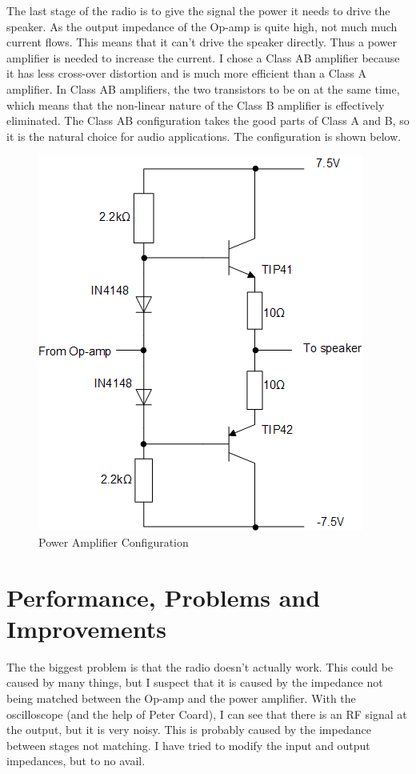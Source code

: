 \documentclass[a4paper,10pt]{report}
\begin{document}
The last stage of the radio is to give the signal the power it needs
to drive the speaker.  As the output impedance of the Op-amp is quite
high, not much much current flows.  This means that it can't drive the
speaker directly.  Thus a power amplifier is needed to increase the
current.  I chose a Class AB amplifier because it has less cross-over
distortion and is much more efficient than a Class A amplifier.  In
Class AB amplifiers, the two transistors to be on at the same time,
which means that the non-linear nature of the Class B amplifier is
effectively eliminated.  The Class AB configuration takes the good
parts of Class A and B, so it is the natural choice for audio
applications.  The configuration is shown below.

\begin{figure}[h]
  \centering
  \includegraphics[scale=0.7]{Power-amp}
  \caption{Power Amplifier Configuration}
\end{figure}
\pagebreak

\chapter{Performance, Problems and Improvements}
The the biggest problem is that the radio doesn't actually work.  This
could be caused by many things, but I suspect that it is caused by the
impedance not being matched between the Op-amp and the power
amplifier.  With the oscilloscope (and the help of Peter Coard), I can
see that there is an RF signal at the output, but it is very noisy.
This is probably caused by the impedance between stages not matching.
I have tried to modify the input and output impedances, but to no
avail.
\end{document}
